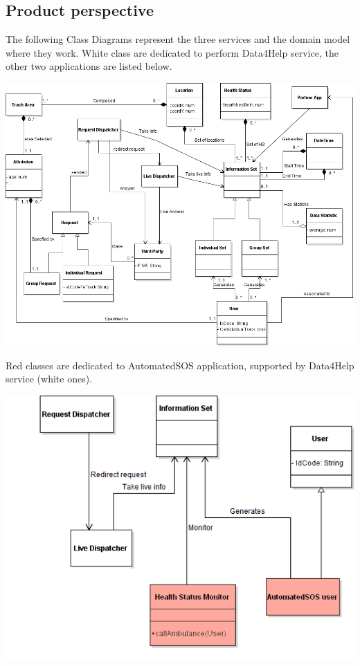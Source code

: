 
\subsection{Product perspective}
\begin{minipage}{\textwidth}
The following Class Diagrams represent the three services and the domain model where they work.
White class are dedicated to perform Data4Help service, the other two applications are listed below.
\begin{center}
\includegraphics[scale=0.45]{Images/Class_Data4Help.png}
\end{center}
\bigbreak
{\color{Salmon} Red classes} are dedicated to {\color{Salmon} AutomatedSOS} application, supported by Data4Help service (white ones).
\begin{center}
\includegraphics[scale=0.55]{Images/Class_AutoSOS.png}
\end{center}
\end{minipage}
\clearpage

